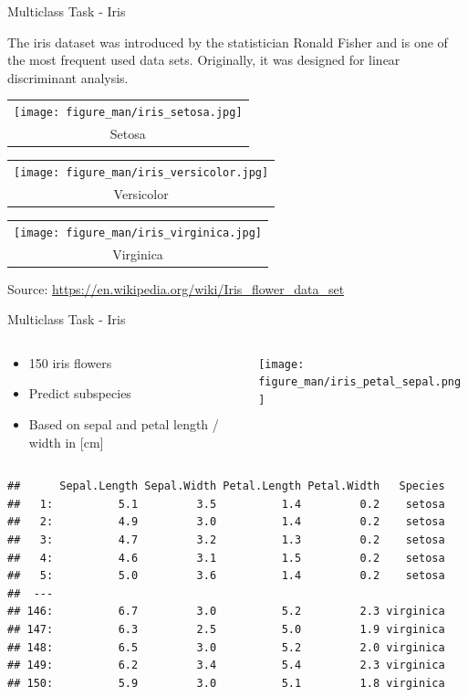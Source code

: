 \documentclass[11pt,compress,t,notes=noshow, xcolor=table]{beamer}
\begin{document}
\begin{vbframe}{Multiclass Task - Iris}

The iris dataset was introduced by the statistician Ronald Fisher and is one
of the most frequent used data sets. Originally, it was designed for linear
discriminant analysis.

\begin{center}
\parbox{0.3\textwidth}{
\centering
  \begin{tabular}{@{}c@{}}
    \texttt{[image: figure\_man/iris\_setosa.jpg]} \\[\abovecaptionskip]
    \small Setosa
  \end{tabular}
}
\parbox{0.3\textwidth}{
\centering
  \begin{tabular}{@{}c@{}}
    \texttt{[image: figure\_man/iris\_versicolor.jpg]} \\[\abovecaptionskip]
    \small Versicolor
  \end{tabular}
}
\parbox{0.3\textwidth}{
\centering
  \begin{tabular}{@{}c@{}}
    \texttt{[image: figure\_man/iris\_virginica.jpg]} \\[\abovecaptionskip]
    \small Virginica
  \end{tabular}
}
\end{center}
  Source: \url{https://en.wikipedia.org/wiki/Iris\_flower\_data\_set}
\end{vbframe}

\begin{vbframe}{Multiclass Task - Iris}

\begin{columns}[T]
\begin{column}{0.5\textwidth}
\begin{itemize}
\item 150 iris flowers
\item Predict subspecies
\item Based on sepal and petal length / width in [cm]
\end{itemize}
\end{column}
\begin{column}{0.5\textwidth}
\texttt{[image: figure\_man/iris\_petal\_sepal.png]}
\end{column}
\end{columns}
{\scriptsize
\begin{verbatim}
##      Sepal.Length Sepal.Width Petal.Length Petal.Width   Species
##   1:          5.1         3.5          1.4         0.2    setosa
##   2:          4.9         3.0          1.4         0.2    setosa
##   3:          4.7         3.2          1.3         0.2    setosa
##   4:          4.6         3.1          1.5         0.2    setosa
##   5:          5.0         3.6          1.4         0.2    setosa
##  ---
## 146:          6.7         3.0          5.2         2.3 virginica
## 147:          6.3         2.5          5.0         1.9 virginica
## 148:          6.5         3.0          5.2         2.0 virginica
## 149:          6.2         3.4          5.4         2.3 virginica
## 150:          5.9         3.0          5.1         1.8 virginica
\end{verbatim}
}
\end{vbframe}
\end{document}
